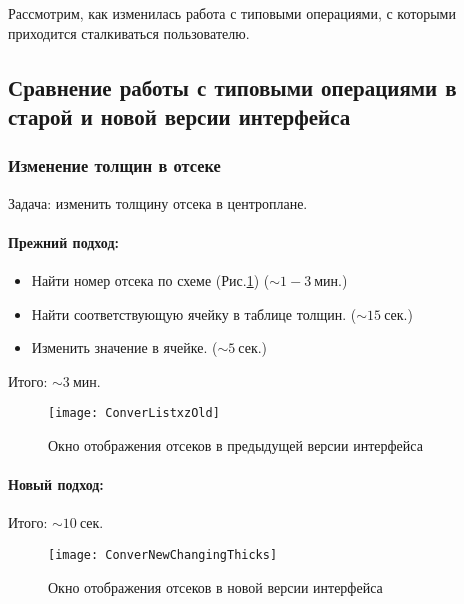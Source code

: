 Рассмотрим, как изменилась работа с типовыми операциями, с которыми приходится сталкиваться пользователю. 


\subsection{Сравнение работы с типовыми операциями в старой и новой версии интерфейса}

\subsubsection{Изменение толщин в отсеке}

Задача: изменить толщину отсека в центроплане. 

\paragraph{Прежний подход:} 

\begin{itemize}
\item Найти номер отсека по схеме (Рис.\ref{fig:ConverListxzOld}) ($\sim1-3~\text{мин.}$)
\item Найти соответствующую ячейку в таблице толщин. ($\sim15~\text{сек.}$)
\item Изменить значение в ячейке. ($\sim5~\text{сек.}$)
\end{itemize}

Итого: $\sim3~\text{мин.}$

\begin{figure}[ht]
\centering
\texttt{[image: ConverListxzOld]}
\caption{Окно отображения отсеков в предыдущей версии интерфейса}
\label{fig:ConverListxzOld}
\end{figure}

\paragraph{Новый подход:}


Итого: $\sim10~\text{сек.}$

\begin{figure}[ht]
\centering
\texttt{[image: ConverNewChangingThicks]}
\caption{Окно отображения отсеков в новой версии интерфейса}
\label{ConverNewChangingThicks}
\end{figure}

